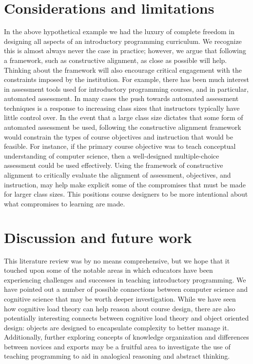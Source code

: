 \documentclass[12pt]{article}
\begin{document}
\section*{Considerations and limitations}
In the above hypothetical example we had the luxury of complete
freedom in designing all aspects of an introductory programming
curriculum. We recognize this is almost always never the case in
practice; however, we argue that following a framework, such as
constructive alignment, as close as possible will help. Thinking about
the framework will also encourage critical engagement with the
constraints imposed by the institution. For example, there has been
much interest in assessment tools used for introductory programming
courses\autocite{lister_blooming_2000,lister_objectives_2001,sheard_exploring_2011},
and in particular, automated
assessment\autocite{cheang_automated_2003,traynor_synthesis_2005,ihantola_review_2010}. In
many cases the push towards automated assessment techniques is a
response to increasing class sizes that instructors typically have
little control over. In the event that a large class size dictates
that some form of automated assessment be used, following the
constructive alignment framework would constrain the types of course
objectives and instruction that would be feasible. For instance, if
the primary course objective was to teach conceptual understanding of
computer science, then a well-designed multiple-choice assessment
could be used
effectively\autocite{lister_blooming_2000,lister_objectives_2001}. Using
the framework of constructive alignment to critically evaluate the
alignment of assessment, objectives, and instruction, may help make
explicit some of the compromises that must be made for larger class
sizes. This positions course designers to be more intentional about
what compromises to learning are made.

\section*{Discussion and future work}

This literature review was by no means comprehensive, but we hope that
it touched upon some of the notable areas in which educators have been
experiencing challenges and successes in teaching introductory
programming. We have pointed out a number of possible connections
between computer science and cognitive science that may be worth
deeper investigation. While we have seen how cognitive load theory can
help reason about course design, there are also potentially
interesting connects between cognitive load theory and object oriented
design: objects are designed to encapsulate complexity to better
manage it. Additionally, further exploring concepts of knowledge
organization and differences between novices and exports may be a
fruitful area to investigate the use of teaching programming to aid in
analogical reasoning and abstract
thinking\autocite{bennedssen_abstraction_2008}.
\end{document}
